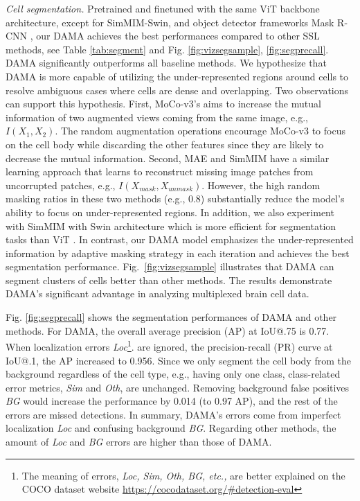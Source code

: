 \documentclass[10pt,twocolumn,letterpaper]{article}
\begin{document}
\textcolor{nblue}{\textit{Cell segmentation.}} Pretrained and finetuned with the same ViT backbone architecture, except for SimMIM-Swin, and object detector frameworks Mask R-CNN \cite{maskrcnn}, our DAMA achieves the best performances compared to other SSL methods, see Table \ref{tab:segment} and Fig. \ref{fig:vizsegsample}, \ref{fig:segprecall}. DAMA significantly outperforms all baseline methods. We hypothesize that DAMA is more capable of utilizing the under-represented regions around cells to resolve ambiguous cases where cells are dense and overlapping. Two observations can support this hypothesis. First, MoCo-v3's \cite{mocov3} aims to increase the mutual information of two augmented views coming from the same image, e.g., $I(X_1,X_2)$. The random augmentation operations encourage MoCo-v3 to focus on the cell body while discarding the other features since they are likely to decrease the mutual information. Second, MAE \cite{mae} and SimMIM \cite{simmim} have a similar learning approach that learns to reconstruct missing image patches from uncorrupted patches, e.g., $I(X_{mask}, X_{unmask})$. However, the high random masking ratios in these two methods (e.g., 0.8) substantially reduce the model's ability to focus on under-represented regions.  
In addition, we also experiment with SimMIM with Swin \cite{swin} architecture which is more efficient for segmentation tasks than ViT \cite{simmim,swin}. In contrast, our DAMA model emphasizes the under-represented information by adaptive masking strategy in each iteration and achieves the best segmentation performance. Fig.~\ref{fig:vizsegsample} illustrates that DAMA can segment clusters of cells better than other methods. The results demonstrate DAMA's significant advantage in analyzing multiplexed brain cell data.

Fig. \ref{fig:segprecall} shows the segmentation performances of DAMA and other methods. For DAMA, the overall average precision (AP) at IoU@.75 is 0.77. When localization errors \textit{Loc}\footnote{The meaning of errors, \textit{Loc, Sim, Oth, BG, etc.,} are better explained on the COCO dataset website \url{https://cocodataset.org/\#detection-eval}}. are ignored, the precision-recall (PR) curve at IoU@.1, the AP increased to 0.956. Since we only segment the cell body from the background regardless of the cell type, e.g., having only one class, class-related error metrics, \textit{Sim} and \textit{Oth}, are unchanged. Removing background false positives \textit{BG} would increase the performance by 0.014 (to 0.97 AP), and the rest of the errors are missed detections. In summary, DAMA's errors come from imperfect localization \textit{Loc} and confusing background \textit{BG}. Regarding other methods, the amount of \textit{Loc} and \textit{BG} errors are higher than those of DAMA.
\end{document}
